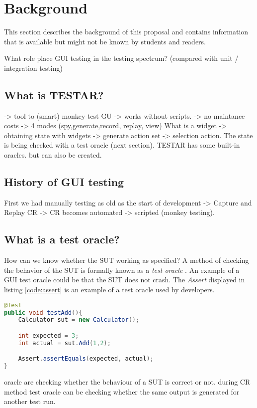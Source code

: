\section{Background} \label{background}
This section describes the background of this proposal and contains information that is available but might not be known by students and readers.

What role place GUI testing in the testing spectrum? (compared with unit / integration testing)

\subsection{What is TESTAR?}
-> tool to (smart) monkey test GU -> works without scripts. -> no maintance costs -> 4 modes (spy,generate,record, replay, view)
What is a widget -> obtaining state with widgets -> generate action set -> selection action.
The state is being checked with a test oracle (next section). TESTAR has some built-in oracles. but can also be created.


\subsection{History of GUI testing}
First we had manually testing as old as the start of development -> Capture and Replay CR -> CR becomes automated -> scripted (monkey testing).

\subsection{What is a test oracle?}
How can we know whether the SUT working as specified? A method of checking the behavior of the SUT is formally known as a \textit{test oracle} \cite{testOracles}. An example of a GUI test oracle could be that the SUT does not crash. The \textit{Assert} displayed in listing \ref{code:assert} is an example of a test oracle used by developers.

\begin{lstlisting}[language=Java, caption=Assertion, label=code:assert]
@Test
public void testAdd(){
    Calculator sut = new Calculator();

    int expected = 3;
    int actual = sut.Add(1,2);

    Assert.assertEquals(expected, actual);
}
\end{lstlisting}

oracle are checking whether the behaviour of a SUT is correct or not\cite{testOracles}. during CR method test oracle can be checking whether the same output is generated for another test run. 

